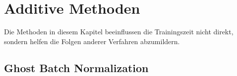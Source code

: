 \section{Additive Methoden}
Die Methoden in diesem Kapitel beeinflussen die Trainingszeit nicht direkt, sondern helfen die Folgen anderer Verfahren abzumildern.

\subsection{Ghost Batch Normalization}

